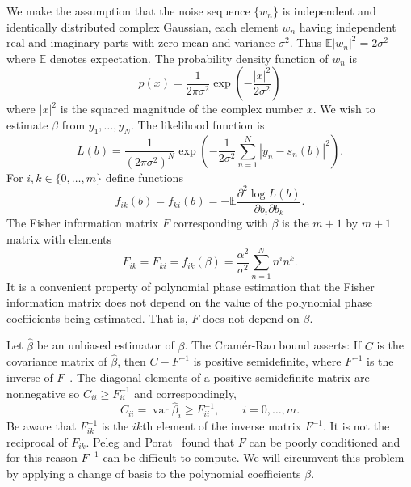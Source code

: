 \documentclass[review]{elsarticle}
\newcommand{\reals}{{\mathbb R}}
\newcommand{\var}{\operatorname{var}}
\newcommand{\expect}{{\mathbb E}}
\newcommand{\abs}[1]{{\left| #1 \right|}}
\begin{document}
We make the assumption that the noise sequence $\{ w_n \}$ is independent and identically distributed complex Gaussian, each element $w_n$ having independent real and imaginary parts with zero mean and variance $\sigma^2$. Thus $\expect\abs{w_n}^2 = 2\sigma^2$ where $\expect$ denotes expectation.  The probability density function of $w_n$ is 
\[
p(x) = \frac{1}{2 \pi \sigma^2} \exp\left( -\frac{\abs{x}^2}{2\sigma^2} \right)
\]
where $\abs{x}^2$ is the squared magnitude of the complex number $x$.  We wish to estimate $\beta$ from $y_1, \dots, y_N$.  The likelihood function is
\[
L(b) = \frac{1}{(2 \pi \sigma^2)^N} \exp\left( - \frac{1}{2\sigma^{2}} \sum_{n=1}^N \abs{y_n -  s_n(b) }^2 \right).
\]
For $i,k \in \{0, \dots, m\}$ define functions 
\[
f_{ik}(b) = f_{ki}(b) = -\expect \frac{ \partial^2 \log L(b) }{ \partial b_{i} \partial b_{k}}.
\]  
The Fisher information matrix $F$ corresponding with $\beta$ is the $m+1$ by $m+1$ matrix with elements
\[
F_{ik} = F_{ki} = f_{ik}(\beta) = \frac{\alpha^2}{\sigma^2}\sum_{n=1}^{N} n^{i}n^{k}.
\]
It is a convenient property of polynomial phase estimation that the Fisher information matrix does not depend on the value of the polynomial phase coefficients being estimated.  That is, $F$ does not depend on $\beta$.

Let $\hat{\beta}$ be an unbiased estimator of $\beta$.  The Cram\'{e}r-Rao bound asserts:  If $C$ is the covariance matrix of $\hat{\beta}$, then $C - F^{-1}$ is positive semidefinite, where $F^{-1}$ is the inverse of $F$~\cite{Kay1993_stat_sig_est_theory}.  The diagonal elements of a positive semidefinite matrix are nonnegative so $C_{ii} \geq F^{-1}_{ii}$ and correspondingly, 
\[
C_{ii} = \var \hat{\beta}_{i} \geq F_{ii}^{-1}, \qquad i=0,\dots,m.
\]  
Be aware that $F_{ik}^{-1}$ is the $ik$th element of the inverse matrix $F^{-1}$.  It is not the reciprocal of $F_{ik}$.  Peleg and Porat~\cite{Peleg1991_CRB_PPS_1991} found that $F$ can be poorly conditioned and for this reason $F^{-1}$ can be difficult to compute.   We will circumvent this problem by applying a change of basis to the polynomial coefficients $\beta$.  %
\end{document}
